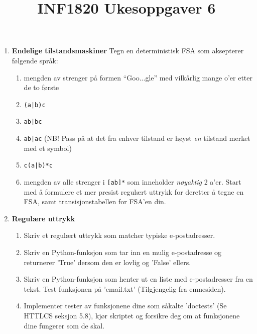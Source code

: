\documentclass[11pt]{article}
\title{INF1820 Ukesoppgaver 6}
\date{}
\begin{document}
\maketitle

\begin{enumerate}
\item {\bf Endelige tilstandsmaskiner} Tegn en deterministisk FSA som aksepterer f{\o}lgende spr{\aa}k:
 \begin{enumerate}
\item mengden av strenger p{\aa} formen ``Goo...gle'' med vilk{\aa}rlig mange o'er etter de to f{\o}rste
\item \verb=(a|b)c=
\item \verb=ab|bc=
\item \verb=ab|ac= (NB! Pass p{\aa} at det fra enhver tilstand er h{\o}yst \emph{en} tilstand merket med et symbol)
\item \verb=c(a|b)*c=
\item mengden av alle strenger i \verb|[ab]*| som inneholder \emph{n{\o}yaktig} 2 a'er. Start med {\aa} formulere et mer presist regul{\ae}rt uttrykk for deretter {\aa} tegne en FSA, samt transisjonstabellen for FSA'en din.
 \end{enumerate}
\item {\bf Regul{\ae}re uttrykk}
\begin{enumerate}
\item Skriv et regul{\ae}rt uttrykk som matcher typiske e-postadresser. 
\item Skriv en Python-funksjon som tar inn en mulig e-postadresse og returnerer 'True' dersom den er lovlig og 'False' ellers.
\item Skriv en Python-funksjon som henter ut en liste med e-postadresser fra en tekst. Test funksjonen p{\aa} 'email.txt' (Tilgjengelig fra emnesiden).
\item Implementer tester av funksjonene dine som s{\aa}kalte 'doctests' (Se HTTLCS seksjon 5.8), kj{\o}r skriptet og forsikre deg om at funksjonene dine fungerer som de skal.

\end{enumerate}
\end{enumerate}
\end{document}
